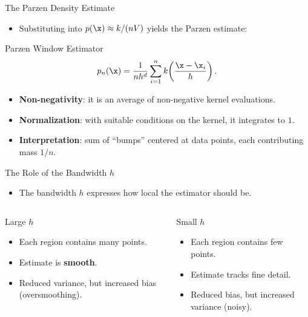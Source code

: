 \begin{frame}{The Parzen Density Estimate}
  \begin{itemize}
    \item Substituting into $p(\x) \approx k/(nV)$ yields the \alert{Parzen estimate}:
  \end{itemize}
  \begin{block}{Parzen Window Estimator}
    \[
      p_n(\x) = \frac{1}{nh^d}\sum_{i=1}^{n} k\!\left(\frac{\x-\x_i}{h}\right).
    \]
  \end{block}
  \vspace{0.4em}
  \begin{itemize}
    \item \textbf{Non-negativity}: it is an average of non-negative kernel evaluations.
    \item \textbf{Normalization}: with suitable conditions on the kernel, it integrates to $1$.
    \item \textbf{Interpretation}: sum of ``bumps'' centered at data points, each contributing mass $1/n$.
  \end{itemize}
\end{frame}

\begin{frame}{The Role of the Bandwidth $h$}
  \begin{itemize}
    \item The bandwidth $h$ expresses how \alert{local} the estimator should be.
  \end{itemize}
  \vspace{0.3em}
  \begin{columns}[t]
      \begin{block}{Large $h$}
        \begin{itemize}
          \item Each region contains many points.
          \item Estimate is \textbf{smooth}.
          \item Reduced variance, but increased \alert{bias} (oversmoothing).
        \end{itemize}
      \end{block}
      \begin{alertblock}{Small $h$}
        \begin{itemize}
          \item Each region contains few points.
          \item Estimate tracks fine detail.
          \item Reduced bias, but increased \alert{variance} (noisy).
        \end{itemize}
      \end{alertblock}
  \end{columns}
\end{frame}

